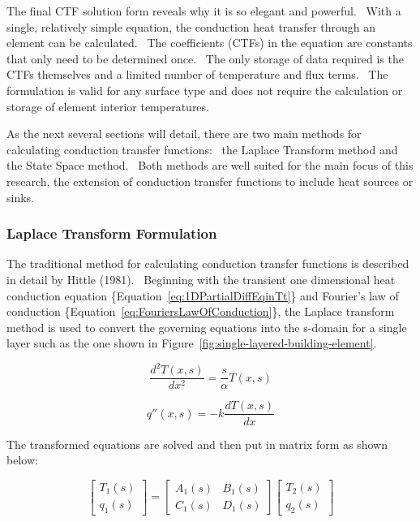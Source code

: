 The final CTF solution form reveals why it is so elegant and powerful.~ With a single, relatively simple equation, the conduction heat transfer through an element can be calculated.~ The coefficients (CTFs) in the equation are constants that only need to be determined once.~ The only storage of data required is the CTFs themselves and a limited number of temperature and flux terms.~ The formulation is valid for any surface type and does not require the calculation or storage of element interior temperatures.

As the next several sections will detail, there are two main methods for calculating conduction transfer functions:~ the Laplace Transform method and the State Space method.~ Both methods are well suited for the main focus of this research, the extension of conduction transfer functions to include heat sources or sinks.

\subsubsection{Laplace Transform Formulation}\label{laplace-transform-formulation}

The traditional method for calculating conduction transfer functions is described in detail by Hittle (1981).~ Beginning with the transient one dimensional heat conduction equation \{Equation~\ref{eq:1DPartialDiffEqinTt}\} and Fourier's law of conduction \{Equation~\ref{eq:FouriersLawOfConduction}\}, the Laplace transform method is used to convert the governing equations into the s-domain for a single layer such as the one shown in Figure~\ref{fig:single-layered-building-element}.

\begin{equation}
\frac{{{d^2}T\left( {x,s} \right)}}{{d{x^2}}} = \frac{s}{\alpha }T\left( {x,s} \right)
\end{equation}

\begin{equation}
q''\left( {x,s} \right) =  - k\frac{{dT\left( {x,s} \right)}}{{dx}}
\end{equation}

The transformed equations are solved and then put in matrix form as shown below:

\begin{equation}
\left[
    {\begin{array}{ccc}
      {{T_1}\left( s \right)} \\ {{q_1}\left( s \right)}
    \end{array}}
  \right] = \left[
    {\begin{array}{ccc}
      {{A_1}\left( s \right)}&{{B_1}\left( s \right)} \\
      {{C_1}\left( s \right)}&{{D_1}\left( s \right)}
    \end{array}}
  \right] \left[
    {\begin{array}{ccc}
      {{T_2}\left( s \right)} \\
      {{q_2}\left( s \right)}
    \end{array}}
  \right]
\end{equation}

